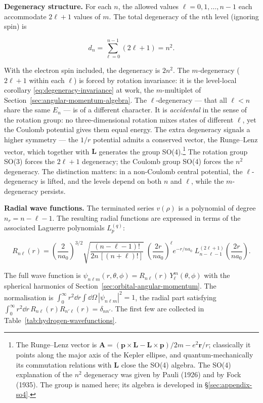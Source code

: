 \medskip\noindent\textbf{Degeneracy structure.} For each $n$, the allowed values $\ell = 0,1,\ldots,n-1$ each accommodate $2\ell+1$ values of $m$. The total degeneracy of the $n$th level (ignoring spin) is
\begin{linenomath}
\begin{equation*}
d_n = \sum_{\ell=0}^{n-1} (2\ell+1) = n^2 .
\end{equation*}
\end{linenomath}
With the electron spin included, the degeneracy is $2n^2$. The $m$-degeneracy ($2\ell+1$ within each $\ell$) is forced by rotation invariance: it is the level-local corollary \eqref{eq:degeneracy-invariance} at work, the $m$-multiplet of Section~\ref{sec:angular-momentum-algebra}. The $\ell$-degeneracy --- that all $\ell < n$ share the same $E_n$ --- is of a different character. It is \emph{accidental} in the sense of the rotation group: no three-dimensional rotation mixes states of different $\ell$, yet the Coulomb potential gives them equal energy. The extra degeneracy signals a higher symmetry --- the $1/r$ potential admits a conserved vector, the Runge--Lenz vector, which together with $\bm L$ generates the group SO(4).\footnote{The Runge--Lenz vector is $\bm A = (\bm p\times\bm L - \bm L\times\bm p)/2m - e^2\bm r/r$; classically it points along the major axis of the Kepler ellipse, and quantum-mechanically its commutation relations with $\bm L$ close the SO(4) algebra. The SO(4) explanation of the $n^2$ degeneracy was given by Pauli (1926) and by Fock (1935). The group is named here; its algebra is developed in \S\ref{sec:appendix-so4}.} The rotation group SO(3) forces the $2\ell+1$ degeneracy; the Coulomb group SO(4) forces the $n^2$ degeneracy. The distinction matters: in a non-Coulomb central potential, the $\ell$-degeneracy is lifted, and the levels depend on both $n$ and $\ell$, while the $m$-degeneracy persists.

\medskip\noindent\textbf{Radial wave functions.} The terminated series $v(\rho)$ is a polynomial of degree $n_r = n-\ell-1$. The resulting radial functions are expressed in terms of the associated Laguerre polynomials $L_{p}^{(q)}$:
\begin{linenomath}
\begin{equation}
R_{n\ell}(r)
= \left(\frac{2}{n a_0}\right)^{\!3/2}
\sqrt{\frac{(n-\ell-1)!}{2n\,[(n+\ell)!]}}\;
\left(\frac{2r}{n a_0}\right)^{\!\ell}
e^{-r/na_0}\;
L_{n-\ell-1}^{(2\ell+1)}\!\left(\frac{2r}{n a_0}\right) .
\label{eq:hydrogen-radial-functions}
\end{equation}
\end{linenomath}
The full wave function is $\psi_{n\ell m}(r,\theta,\phi) = R_{n\ell}(r)\,Y_\ell^m(\theta,\phi)$ with the spherical harmonics of Section~\ref{sec:orbital-angular-momentum}. The normalisation is $\int_0^\infty r^2\dd r\int\dd\Omega\,|\psi_{n\ell m}|^2 = 1$, the radial part satisfying $\int_0^\infty r^2\dd r\,R_{n\ell}(r)R_{n'\ell}(r) = \delta_{nn'}$. The first few are collected in Table~\ref{tab:hydrogen-wavefunctions}.

